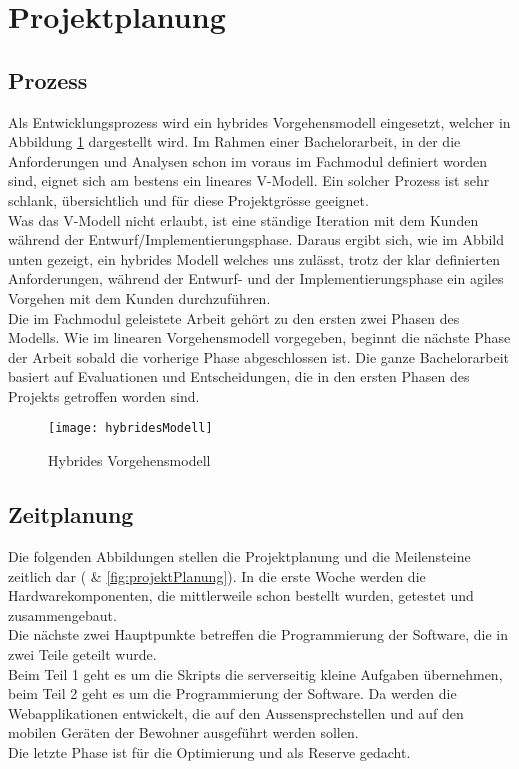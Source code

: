 \section{Projektplanung}
\label{sec:chapterexample}

\subsection{Prozess}
\label{sec:chapterexample}
Als Entwicklungsprozess wird ein hybrides Vorgehensmodell eingesetzt, welcher in Abbildung \ref{fig:hybridesModell} dargestellt wird. Im Rahmen einer Bachelorarbeit, in der die Anforderungen und Analysen schon im voraus im Fachmodul definiert worden sind, eignet sich am bestens ein lineares V-Modell. Ein solcher Prozess ist sehr schlank, übersichtlich und für diese Projektgrösse geeignet.
\\
Was das V-Modell nicht erlaubt, ist eine ständige Iteration mit dem Kunden während der Entwurf/Implementierungsphase. Daraus ergibt sich, wie im Abbild unten gezeigt, ein hybrides Modell welches uns zulässt, trotz der klar definierten Anforderungen, während der Entwurf- und der Implementierungsphase ein agiles Vorgehen mit dem Kunden durchzuführen.
\\
Die im Fachmodul geleistete Arbeit gehört zu den ersten zwei Phasen des Modells. Wie im linearen Vorgehensmodell vorgegeben, beginnt die nächste Phase der Arbeit sobald die vorherige Phase abgeschlossen ist. Die ganze Bachelorarbeit basiert auf Evaluationen und Entscheidungen, die in den ersten Phasen des Projekts getroffen worden sind. 

\begin{figure}[htb!]
	\begin{center}
		\texttt{[image: hybridesModell]}
		\caption[Hybrides Vorgehensmodell]{Hybrides Vorgehensmodell}
		\label{fig:hybridesModell}
	\end{center}
\end{figure}


\subsection{Zeitplanung}
\label{sec:zeitplanung}
Die folgenden Abbildungen stellen die Projektplanung und die Meilensteine zeitlich dar ( \& \cref{fig:projektPlanung}). In die erste Woche werden die Hardwarekomponenten, die mittlerweile schon bestellt wurden, getestet und zusammengebaut. 
\\
Die nächste zwei Hauptpunkte betreffen die Programmierung der  Software, die in zwei Teile geteilt wurde.
\\ 
Beim Teil 1 geht es um die Skripts die serverseitig kleine Aufgaben übernehmen, beim Teil 2 geht es um die Programmierung der Software. Da werden die Webapplikationen entwickelt, die auf den Aussensprechstellen und auf den mobilen Geräten der Bewohner ausgeführt werden sollen.
\\
Die letzte Phase ist für die Optimierung und als Reserve gedacht.

